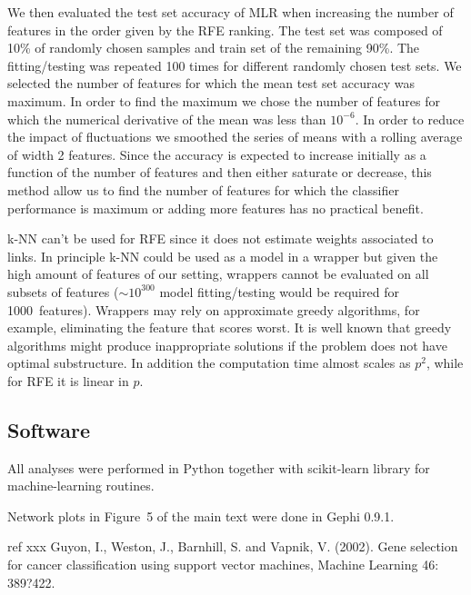 \documentclass{article}
\begin{document}
We then evaluated the test set accuracy of MLR when increasing the number of features in the order given by the RFE ranking. The test set was composed of 10\% of randomly chosen samples and train set of the remaining 90\%. The fitting/testing was repeated 100 times for different randomly chosen test sets. We selected the number of features for which the mean test set accuracy was maximum. In order to find the maximum we chose the number of features for which the numerical derivative of the mean was less than $10^{-6}$. In order to reduce the impact of fluctuations we smoothed the series of means with a rolling average of width 2 features. Since the accuracy is expected to increase initially as a function of the number of features and then either saturate or decrease, this method allow us to find the number of features for which the classifier performance is maximum or adding more features has no practical benefit.

k-NN can't be used for RFE since it does not estimate weights associated to links. In principle k-NN could be used as a model in a wrapper but given the high amount of features of our setting, wrappers cannot be evaluated on all subsets of features ($\sim 10^{300}$ model fitting/testing would be required for 1000~features). Wrappers may rely on approximate greedy algorithms, for example, eliminating the feature that scores worst. It is well known that greedy algorithms might produce inappropriate solutions if the problem does not have optimal substructure. In addition the computation time almost scales as $p^2$, while for RFE it is linear in $p$.
  
  
\subsection{Software}

All analyses were performed in Python together with scikit-learn library for machine-learning routines.

Network plots in Figure~5 of the main text were done in Gephi 0.9.1.






ref xxx Guyon, I., Weston, J., Barnhill, S. and Vapnik, V. (2002). Gene selection for
cancer classification using support vector machines, Machine Learning
46: 389?422.  
  
\end{document}
